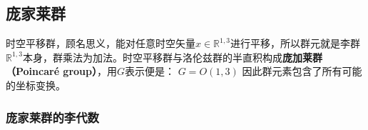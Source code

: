

\begin{issues}
\issueTODO
\end{issues}


\subsection{庞家莱群}
时空平移群，顾名思义，能对任意时空矢量$x\in \mathbb R^{1,3} $进行平移，所以群元就是李群$\mathbb R^{1,3}$本身，群乘法为加法。时空平移群与洛伦兹群的半直积构成\textbf{庞加莱群（Poincaré group）}，用$G$表示便是：
$G=O(1,3)$
因此群元素包含了所有可能的坐标变换。

\subsubsection{庞家莱群的李代数}